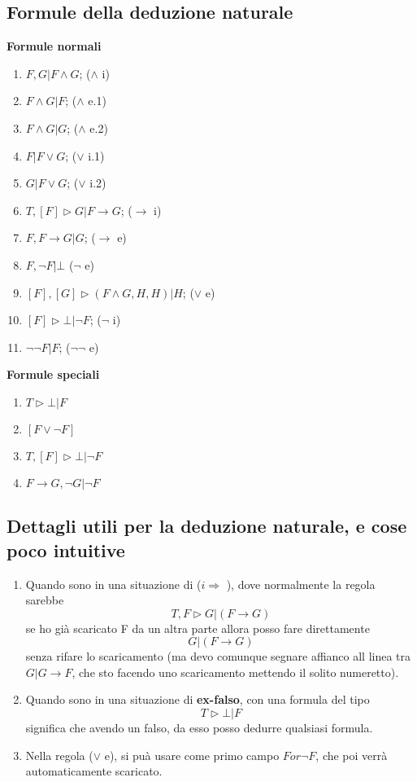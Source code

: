 \documentclass[11pt]{article}
\begin{document}
\subsection{Formule della deduzione naturale}
\textbf{Formule normali}
\begin{enumerate}
    \item $ F,G | F \land G$; ($\land$ i)
    \item $F \land G|F$; ($\land$ e.1)
    \item $F \land G|G$; ($\land$ e.2)
    \item $F|F \lor G$; ($\lor$ i.1)
    \item $G|F \lor G$; ($\lor$ i.2)
    \item $T,[F] \triangleright G|F \rightarrow G$; ($\rightarrow$ i)
    \item $F,F \rightarrow G| G$; ($\rightarrow$ e)
    \item $F, \neg F| \bot$ ($\neg$ e)
    \item $[F],[G] \triangleright (F \land G, H, H)| H$; ($\lor$ e)
    \item $[F] \triangleright \bot | \neg F$; ($\neg$ i)
    \item $\neg \neg F| F$; ($\neg \neg$ e)
\end{enumerate}
\textbf{Formule speciali}
\begin{enumerate}
    \item $T \triangleright \bot| F$
    \item $[F \lor \neg F]$
    \item $T,[F] \triangleright \bot| \neg F$
    \item $F \rightarrow G, \neg G| \neg F$
\end{enumerate}
\subsection{Dettagli utili per la deduzione naturale, e cose poco intuitive}
\begin{enumerate}
    \item Quando sono in una situazione di ($i \Rightarrow$ ), 
    dove normalmente la regola sarebbe $$T,F \triangleright G|(F \rightarrow G)$$ 
    se ho già scaricato F da un altra parte allora posso fare direttamente 
    $$G|(F \rightarrow G)$$ senza rifare lo scaricamento (ma devo comunque segnare 
    affianco all linea tra $G| G \rightarrow F$, che sto facendo uno scaricamento
    mettendo il solito numeretto).
    \item Quando sono in una situazione di \textbf{ex-falso}, con una formula del tipo
    $$ T \triangleright \bot|F $$ significa che avendo un falso, da esso posso
    dedurre qualsiasi formula.
    \item Nella regola ($\lor$ e), si puà usare come primo campo $F or \neg F$, che poi verrà automaticamente scaricato.
\end{enumerate}
\end{document}
